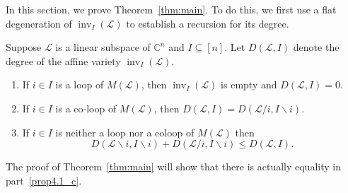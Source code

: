 \documentclass[ALCO,ThmDefs,Unicode,epreuves]{cedram}
\newcommand{\Cbb}{\mathbb{C}}
\newcommand{\cL}{\mathcal{L}}
\DeclareMathOperator{\inv}{inv}
\begin{document}
In this section, we prove Theorem~\ref{thm:main}. To do this, we first use a flat degeneration of $\inv_I(\cL)$ 
to establish a recursion for its degree. 

\begin{prop}\label{prop:DegreeRecurrence}
Suppose $\cL$ is a linear subspace of $\Cbb^n$ and $I\subseteq [n]$. 
Let $D(\cL,I)$ denote the degree of the affine variety $\inv_I(\cL)$. 
\begin{enumerate}[(\alph*)] 
\item\label{prop4.1_a} %
If $i \in I$ is a loop of $M(\cL)$, then $\inv_I(\cL)$ is empty and $D(\cL,I) = 0$. 
\item\label{prop4.1_b} %
If $i\in I$ is a co-loop of $M(\cL)$, then $D(\cL,I) = D(\cL/i, I\backslash i)$. 
\item\label{prop4.1_c} %
If $i\in I$ is neither a loop nor a coloop of $M(\cL)$ then
\[
D(\cL\backslash i,I\backslash i)  +  D(\cL/i, I\backslash i) \leq D(\cL,I).
\]
\end{enumerate}
\end{prop}
The proof of Theorem~\ref{thm:main} will show that there is actually equality in part~\ref{prop4.1_c}. 
\end{document}
